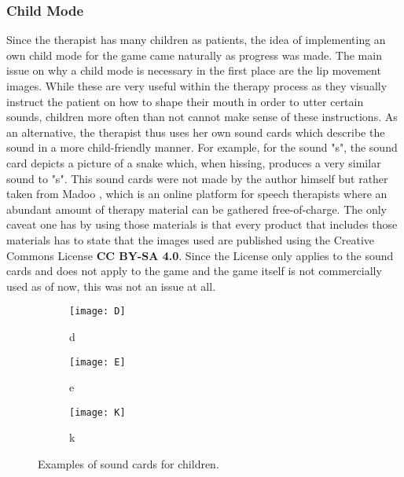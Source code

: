 \documentclass[draft,final]{vutinfth} %
\begin{document}
\subsubsection{Child Mode}
Since the therapist has many children as patients, the idea of implementing an own child mode for the game came naturally as progress was made. The main issue on why a child mode is necessary in the first place are the lip movement images. While these are very useful within the therapy process as they visually instruct the patient on how to shape their mouth in order to utter certain sounds, children more often than not cannot make sense of these instructions. As an alternative, the therapist thus uses her own sound cards which describe the sound in a more child-friendly manner. For example, for the sound "s", the sound card depicts a picture of a snake which, when hissing, produces a very similar sound to "s".
This sound cards were not made by the author himself but rather taken from Madoo \cite{Madoo}, which is an online platform for speech therapists where an abundant amount of therapy material can be gathered free-of-charge. The only caveat one has by using those materials is that every product that includes those materials has to state that the images used are published using the Creative Commons License \textbf{CC BY-SA 4.0}\cite{License}. Since the License only applies to the sound cards and does not apply to the game and the game itself is not commercially used as of now, this was not an issue at all.
\begin{figure}
\begin{subfigure}{.33\textwidth}
  \centering
  \texttt{[image: D]}
  \caption{d}
\end{subfigure}%
\begin{subfigure}{.33\textwidth}
  \centering
  \texttt{[image: E]}
  \caption{e}
\end{subfigure}
\begin{subfigure}{.33\textwidth}
  \centering
  \texttt{[image: K]}
  \caption{k}
\end{subfigure}
\caption{Examples of sound cards for children.}
\end{figure}
\end{document}
